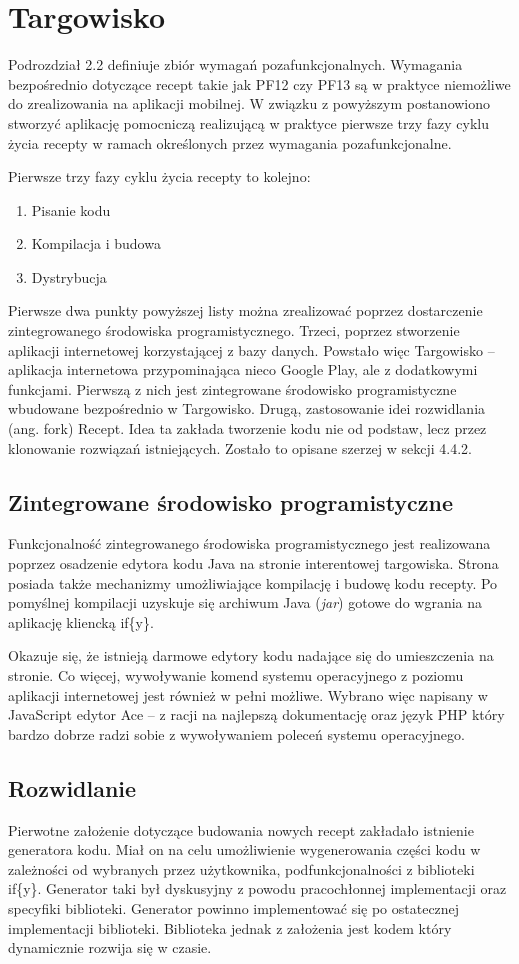 \documentclass[11pt,a4paper,polish,thesis]{dcsbook}
\begin{document}
\section{Targowisko}
Podrozdział 2.2 definiuje zbiór wymagań pozafunkcjonalnych. Wymagania bezpośrednio dotyczące recept takie jak PF12 czy PF13 są w praktyce niemożliwe do zrealizowania
na aplikacji mobilnej. W związku z powyższym postanowiono stworzyć aplikację pomocniczą realizującą w praktyce pierwsze trzy fazy cyklu życia recepty w
ramach określonych przez wymagania pozafunkcjonalne.

Pierwsze trzy fazy cyklu życia recepty to kolejno:
\begin{enumerate}
\item Pisanie kodu
\item Kompilacja i budowa
\item Dystrybucja
\end{enumerate}

Pierwsze dwa punkty powyższej listy można zrealizować poprzez dostarczenie zintegrowanego środowiska programistycznego. Trzeci, poprzez stworzenie aplikacji
internetowej korzystającej z bazy danych. Powstało więc Targowisko -- aplikacja internetowa przypominająca nieco Google Play, ale z dodatkowymi funkcjami.
Pierwszą z nich jest zintegrowane środowisko programistyczne wbudowane bezpośrednio w Targowisko. Drugą, zastosowanie idei rozwidlania (ang. fork) Recept. Idea ta
zakłada tworzenie kodu nie od podstaw, lecz przez klonowanie rozwiązań istniejących. Zostało to opisane szerzej w sekcji 4.4.2.

\subsection{Zintegrowane środowisko programistyczne}
Funkcjonalność zintegrowanego środowiska programistycznego jest realizowana poprzez osadzenie edytora kodu Java na stronie interentowej targowiska. Strona posiada
także mechanizmy umożliwiające kompilację i budowę kodu recepty. Po pomyślnej kompilacji uzyskuje się archiwum Java (\emph{jar}) gotowe do wgrania na aplikację
kliencką if\{y\}.

Okazuje się, że istnieją darmowe edytory kodu nadające się do umieszczenia na stronie. Co więcej, wywoływanie komend systemu operacyjnego z poziomu aplikacji
internetowej jest również w pełni możliwe. Wybrano więc napisany w JavaScript edytor Ace -- z racji na najlepszą dokumentację oraz język PHP który bardzo dobrze
radzi sobie z wywoływaniem poleceń systemu operacyjnego.
\subsection{Rozwidlanie}
Pierwotne założenie dotyczące budowania nowych recept zakładało istnienie generatora kodu. Miał on na celu umożliwienie wygenerowania części kodu w zależności od
wybranych przez użytkownika, podfunkcjonalności z biblioteki if\{y\}. Generator taki był dyskusyjny z powodu pracochłonnej implementacji oraz specyfiki biblioteki.
Generator powinno implementować się po ostatecznej implementacji biblioteki. Biblioteka jednak z założenia jest kodem który dynamicznie rozwija się w czasie.
\end{document}
